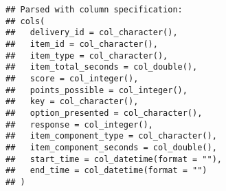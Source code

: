 \documentclass[]{book}
\newenvironment{Shaded}{\begin{snugshade}}{\end{snugshade}}
\newcommand{\KeywordTok}[1]{\textcolor[rgb]{0.13,0.29,0.53}{\textbf{#1}}}
\newcommand{\DecValTok}[1]{\textcolor[rgb]{0.00,0.00,0.81}{#1}}
\newcommand{\StringTok}[1]{\textcolor[rgb]{0.31,0.60,0.02}{#1}}
\newcommand{\ControlFlowTok}[1]{\textcolor[rgb]{0.13,0.29,0.53}{\textbf{#1}}}
\newcommand{\OperatorTok}[1]{\textcolor[rgb]{0.81,0.36,0.00}{\textbf{#1}}}
\newcommand{\NormalTok}[1]{#1}
\theoremstyle{definition}
\theoremstyle{definition}
\theoremstyle{definition}
\theoremstyle{remark}
\begin{document}
\begin{Shaded}
\end{Shaded}

\begin{verbatim}
## Parsed with column specification:
## cols(
##   delivery_id = col_character(),
##   item_id = col_character(),
##   item_type = col_character(),
##   item_total_seconds = col_double(),
##   score = col_integer(),
##   points_possible = col_integer(),
##   key = col_character(),
##   option_presented = col_character(),
##   response = col_integer(),
##   item_component_type = col_character(),
##   item_component_seconds = col_double(),
##   start_time = col_datetime(format = ""),
##   end_time = col_datetime(format = "")
## )
\end{verbatim}
\end{document}
